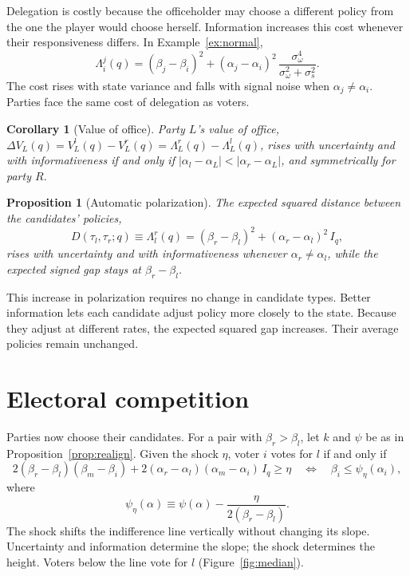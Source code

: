 \documentclass[12pt,letterpaper]{article}
\newtheorem{corollary}{Corollary}
\newtheorem{proposition}{Proposition}
\begin{document}
Delegation is costly because the officeholder may choose a different policy from the one the player would choose herself. Information increases this cost whenever their responsiveness differs. In Example~\ref{ex:normal},
\[
\Lambda_i^j(q)=(\beta_j-\beta_i)^2+(\alpha_j-\alpha_i)^2\,\frac{\sigma_\omega^4}{\sigma_\omega^2+\sigma_s^2}.
\]
The cost rises with state variance and falls with signal noise when $\alpha_j\ne\alpha_i$. Parties face the same cost of delegation as voters.

\begin{corollary}[Value of office]\label{cor:office}
Party $L$'s value of office, $\Delta V_L(q)=V_L^l(q)-V_L^r(q)=\Lambda_L^r(q)-\Lambda_L^l(q)$, rises with uncertainty and with informativeness if and only if $|\alpha_l-\alpha_L|<|\alpha_r-\alpha_L|$, and symmetrically for party $R$.
\end{corollary}

\begin{proposition}[Automatic polarization]\label{prop:auto-polar}
The expected squared distance between the candidates' policies,
\[
D(\tau_l,\tau_r;q)\equiv\Lambda_l^r(q)=(\beta_r-\beta_l)^2+(\alpha_r-\alpha_l)^2\,I_q ,
\]
rises with uncertainty and with informativeness whenever $\alpha_r\ne\alpha_l$, while the expected signed gap stays at $\beta_r-\beta_l$.
\end{proposition}

This increase in polarization requires no change in candidate types. Better information lets each candidate adjust policy more closely to the state. Because they adjust at different rates, the expected squared gap increases. Their average policies remain unchanged.

\section{Electoral competition}\label{sec:competition}

Parties now choose their candidates. For a pair with $\beta_r>\beta_l$, let $k$ and $\psi$ be as in Proposition~\ref{prop:realign}. Given the shock $\eta$, voter $i$ votes for $l$ if and only if
\[
2(\beta_r-\beta_l)(\beta_m-\beta_i)+2(\alpha_r-\alpha_l)(\alpha_m-\alpha_i)\,I_q\ge\eta
\quad\Longleftrightarrow\quad
\beta_i\le\psi_\eta(\alpha_i),
\]
where
\[
\psi_\eta(\alpha)\equiv\psi(\alpha)-\frac{\eta}{2(\beta_r-\beta_l)}.
\]
The shock shifts the indifference line vertically without changing its slope. Uncertainty and information determine the slope; the shock determines the height. Voters below the line vote for $l$ (Figure~\ref{fig:median}).
\end{document}
